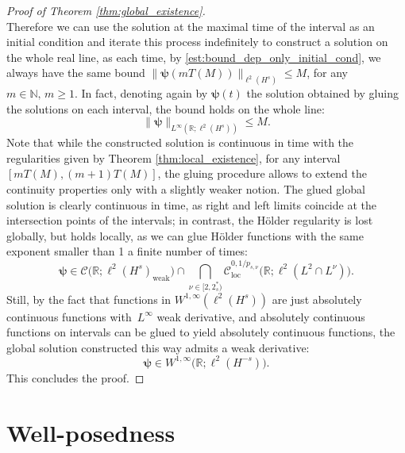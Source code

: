 \documentclass[12pt,a4paper]{amsart}
\numberwithin{equation}{section}
\newcommand{\ulpsi}{\boldsymbol{\psi}}
\newcommand{\twoasts}{{2^*_s}}
\newcommand{\psnu}{p_{s,\nu}}
\begin{document}
\begin{proof}[Proof of Theorem \ref{thm:global_existence}]
\begin{equation}
		\end{equation}
		Therefore we can use the solution at the maximal time of the interval as an initial condition and iterate this process indefinitely to construct a solution on the whole real line, as each time, by \eqref{est:bound_dep_only_initial_cond}, we always have the same bound $ \| \ulpsi(mT(M)) \|_{\ell^2(H^s)} \leq M $, for any $m \in \mathbb{N}, \, m \geq 1 $. In fact, denoting again by $ \ulpsi(t)$ the solution obtained by gluing the solutions on each interval, the bound holds on the whole line:
		\begin{equation}
			\| \ulpsi \|_{L^\infty(\mathbb{R};\ell^2(H^s))} \leq M.
		\end{equation}
		Note that while the constructed solution is continuous in time with the regularities given by Theorem \ref{thm:local_existence}, for any interval $[m T(M), (m+1) T(M)] $, the gluing procedure allows to extend the continuity properties only with a slightly weaker notion.
		The glued global solution is clearly continuous in time, as right and left limits coincide at the intersection points of the intervals; in contrast, the H{\"o}lder regularity is lost globally, but holds locally, as we can glue H{\"o}lder functions with the same exponent smaller than 1 a finite number of times:
		\begin{equation*}
			\ulpsi \in \mathscr{C}\big(\mathbb{R};\ell^2(H^{s})_{\mathrm{weak}}\big) \cap \bigcap_{\nu \in [2,\twoasts ) } \mathscr{C}_{\mathrm{loc}}^{0,1/\psnu}\big(\mathbb{R};\ell^2(L^2\cap L^\nu)\big).
		\end{equation*}
		Still, by the fact that functions in $ W^{1,\infty}(\ell^2(H^{s})) $ are just absolutely continuous functions with~$L^\infty$ weak derivative, and absolutely continuous functions on intervals can be glued to yield absolutely continuous functions, the global solution constructed this way  admits a weak derivative:
		\begin{equation}
			\ulpsi \in W^{1, \infty}\big(\mathbb{R};\ell^2(H^{-s})\big) .
		\end{equation}
		This concludes the proof.
	\end{proof}
	
	
	\section{Well-posedness}\label{sec:Strichartz}
	
\end{document}
